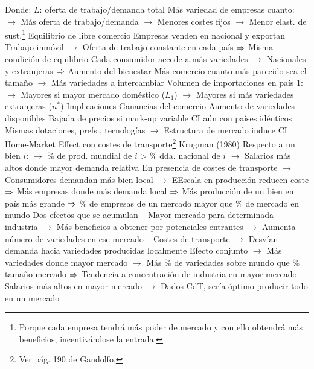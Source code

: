 \documentclass{nuevotema}
\begin{document}
\begin{esquemal}
				\4[] 
				\4[] Donde: $\bar{L}$: oferta de trabajo/demanda total
				\4[] Más variedad de empresas cuanto:
				\4[] $\to$ Más oferta de trabajo/demanda
				\4[] $\to$ Menores costes fijos
				\4[] $\to$ Menor elast. de sust.\footnote{Porque cada empresa tendrá más poder de mercado y con ello obtendrá más beneficios, incentivándose la entrada.}
				\4 Equilibrio de libre comercio
				\4[] Empresas venden en nacional y exportan
				\4[] Trabajo inmóvil
				\4[] $\to$ Oferta de trabajo constante en cada país
				\4[] $\Rightarrow$ Misma condición de equilibrio
				\4[] Cada consumidor accede a más variedades
				\4[] $\to$ Nacionales y extranjeras
				\4[] $\Rightarrow$ Aumento del bienestar
				\4[] Más comercio cuanto más parecido sea el tamaño
				\4[] $\to$ Más variedades a intercambiar
				\4[] Volumen de importaciones en país 1:
				\4[] 
				\4[] $\to$ Mayores si mayor mercado doméstico ($L_1$)
				\4[] $\to$ Mayores si más variedades extranjeras ($n^*$)
			\3 Implicaciones
				\4 Ganancias del comercio
				\4[] Aumento de variedades disponibles
				\4[] Bajada de precios si mark-up variable
				\4 CI aún con países idénticos
				\4[] Mismas dotaciones, prefs., tecnologías
				\4[] $\to$ Estructura de mercado induce CI
				\4 Home-Market Effect con costes de transporte\footnote{Ver pág. 190 de Gandolfo.}
				\4[] Krugman (1980)
				\4[] Respecto a un bien $i$:
				\4[] $\to$ \% de prod. mundial de $i$ > \% dda. nacional de $i$
				\4[] $\to$ Salarios más altos donde mayor demanda relativa
				\4[] En presencia de costes de transporte
				\4[] $\to$ Consumidores demandan más bien local
				\4[] $\to$ EEscala en producción reducen coste
				\4[] $\Rightarrow$ Más empresas donde más demanda local
				\4[] $\Rightarrow$ Más producción de un bien en país más grande
				\4[] $\Rightarrow$ \% de empresas de un mercado mayor que \% de mercado en mundo
				\4[] Dos efectos que se acumulan
				\4[] -- Mayor mercado para determinada industria
				\4[] $\to$ Más beneficios a obtener por potenciales entrantes
				\4[] $\to$ Aumenta número de variedades en ese mercado
				\4[] -- Costes de transporte
				\4[] $\to$ Desvían demanda hacia variedades producidas localmente
				\4[] Efecto conjunto
				\4[] $\to$ Más variedades donde mayor mercado
				\4[] $\to$ Más \% de variedades sobre mundo que \% tamaño mercado
				\4[] $\Rightarrow$ Tendencia a concentración de industria en mayor mercado
				\4[] Salarios más altos en mayor mercado
				\4[] $\to$ Dados CdT, sería óptimo producir todo en un mercado

\end{esquemal}
\end{document}
